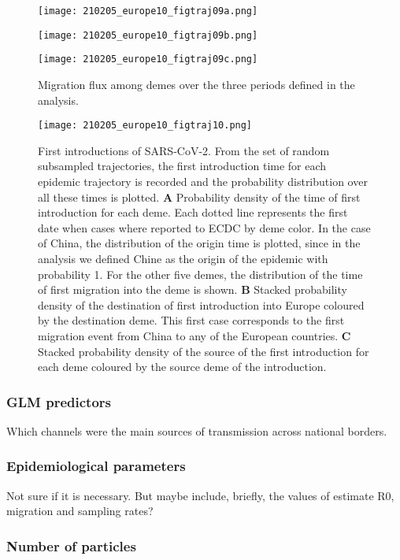 \begin{figure}[!tbp]
  \centering

  \begin{minipage}[t]{0.4\textwidth}
  \texttt{[image: 210205\_europe10\_figtraj09a.png]}
  \label{fig:migs1}
  \end{minipage}
  \begin{minipage}[t]{0.4\textwidth}
  \texttt{[image: 210205\_europe10\_figtraj09b.png]}
  \label{fig:migs2}
  \end{minipage}
  \begin{minipage}[t]{0.4\textwidth}
  \texttt{[image: 210205\_europe10\_figtraj09c.png]}
  \label{fig:migs3}
  \end{minipage}
  \caption{Migration flux among demes over the three periods defined in the analysis.}
  \label{fig:migs}
\end{figure}



\begin{figure}[p]
    \centering
    \texttt{[image: 210205\_europe10\_figtraj10.png]}
    \caption{First introductions of SARS-CoV-2. From the set of random subsampled trajectories, the first introduction time for each epidemic trajectory is recorded and the probability distribution over all these times is plotted. \textbf{A} Probability density of the time of first introduction for each deme. Each dotted line represents the first date when cases where reported to ECDC by deme color. In the case of China, the distribution of the origin time is plotted, since in the analysis we defined Chine as the origin of the epidemic with probability 1. For the other five demes, the distribution of the time of first migration into the deme is shown. \textbf{B} Stacked probability density of the destination of first introduction into Europe coloured by the destination deme. This first case corresponds to the first migration event from China to any of the European countries. \textbf{C} Stacked probability density of the source of the first introduction for each deme coloured by the source deme of the introduction.}
    \label{fig:first}
\end{figure}


\subsubsection*{GLM predictors}

Which channels were the main sources of transmission across national borders.

\subsubsection*{Epidemiological parameters}

Not sure if it is necessary. But maybe include, briefly, the values of estimate R0, migration and sampling rates?

\subsubsection*{Number of particles}
